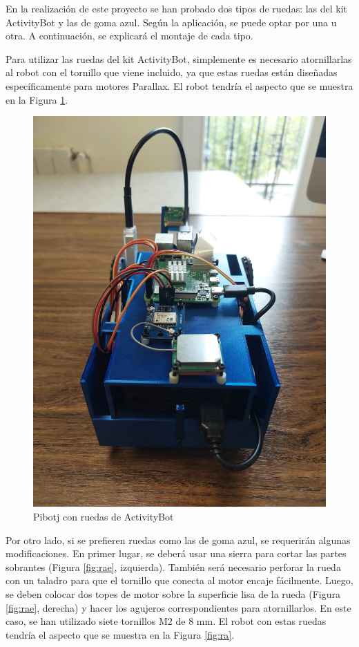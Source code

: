 En la realización de este proyecto se han probado dos tipos de ruedas: las del kit ActivityBot y las de goma azul. Según la aplicación, se puede optar por una u otra. A continuación, se explicará el montaje de cada tipo.

Para utilizar las ruedas del kit ActivityBot, simplemente es necesario atornillarlas al robot con el tornillo que viene incluido, ya que estas ruedas están diseñadas específicamente para motores Parallax. El robot tendría el aspecto que se muestra en la Figura \ref{fig:ab}.

\begin{figure} [h!]
	\begin{center}
		\includegraphics[width=12cm]{figs/cap5/ab.jpeg}
	\end{center}
	\caption{Pibotj con ruedas de ActivityBot} 
	\label{fig:ab}
\end{figure}

Por otro lado, si se prefieren ruedas como las de goma azul, se requerirán algunas modificaciones. En primer lugar, se deberá usar una sierra para cortar las partes sobrantes (Figura \ref{fig:rae}, izquierda). También será necesario perforar la rueda con un taladro para que el tornillo que conecta al motor encaje fácilmente. Luego, se deben colocar dos topes de motor sobre la superficie lisa de la rueda (Figura \ref{fig:rae}, derecha) y hacer los agujeros correspondientes para atornillarlos. En este caso, se han utilizado siete tornillos M2 de 8 mm. El robot con estas ruedas tendría el aspecto que se muestra en la Figura \ref{fig:ra}.

